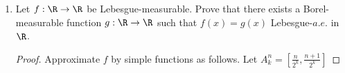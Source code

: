 \documentclass[12pt,letterpaper]{article}
\begin{document}
\begin{enumerate}
\begin{proof}
\pagebreak
Observe that $\mu_n (B_{\floor{x}})$ is a countable sequence of real-valued measurable functions of $x$, and $\mu_1 (B_{\floor{x}})$ dominates the sequence since $\mu_n(B)\leq\mu_1(B)$ for all sets $B$, and 
\begin{align*}
\int_1^\infty \mu_1 (B_{\floor{x}}) \dx &= \sum_{i=1}^\infty \mu_1(B_i) \\
&\begin{rcases*}
\ds= \sum_{i=1}^\infty \mu_1(B_i) \\
\ds=\mu_1\bigg(\bigcup_{i=1}^\infty B_i\bigg) \quad 
\end{rcases*}\text{Since }B_i\text{ sets are disjoint}\\
&\leq\mu_1 (X)\\
&<\infty.
\end{align*}
Thus $\mu_1 (B_{\floor{x}})$ is $\dx$-summable, and the conditions of reverse Fatou's lemma are satisfied.
\end{proof}


\item Let $f:\R\to \R$ be Lebesgue-measurable. Prove that there exists a Borel-measurable function $g:\R\to\R$ such that $f(x)=g(x)$ Lebesgue-$a.e.$ in $\R$. 

\begin{proof}
Approximate $f$ by simple functions as follows. Let $A_k^n=[\frac{n}{2^k}, \frac{n+1}{2^k}]$ 
\end{proof}

\end{enumerate}
\end{document}
